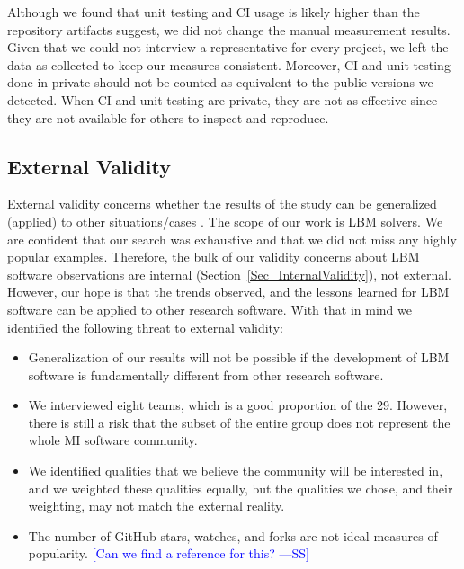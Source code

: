 \documentclass[final, 3p, times, authoryear]{elsarticle}
\newcommand{\authornote}[3]{\textcolor{#1}{[#3 ---#2]}}
\newcommand{\authornote}[3]{}
\newcommand{\wss}[1]{\authornote{blue}{SS}{#1}} %
\begin{document}
Although we found that unit testing and CI usage is likely higher than the
repository artifacts suggest, we did not change the manual measurement results.
Given that we could not interview a representative for every project, we left
the data as collected to keep our measures consistent.  Moreover, CI and unit
testing done in private should not be counted as equivalent to the public
versions we detected.  When CI and unit testing are private, they are not as
effective since they are not available for others to inspect and reproduce.

\subsection{External Validity}

External validity concerns whether the results of the study can be generalized
(applied) to other situations/cases \citep{RunesonAndHost2009}.  The scope of
our work is LBM solvers.  We are confident that our search was exhaustive and
that we did not miss any highly popular examples.  Therefore, the bulk of our
validity concerns about LBM software observations are internal
(Section~\ref{Sec_InternalValidity}), not external.  However, our hope is that
the trends observed, and the lessons learned for LBM software can be applied to
other research software.  With that in mind we identified the following threat
to external validity:

\begin{itemize}
\item Generalization of our results will not be possible if the development of
LBM software is fundamentally different from other research software.
\end{itemize}

\begin{itemize}
\item We interviewed eight teams, which is a good proportion of the 29. However,
there is still a risk that the subset of the entire group does not represent the
whole MI software community.
\item We identified qualities that we believe the community will be interested
in, and we weighted these qualities equally, but the qualities we chose, and
their weighting, may not match the external reality.
\item The number of GitHub stars, watches, and forks are not ideal measures of
popularity.  \wss{Can we find a reference for this?}
\end{itemize}
\end{document}
